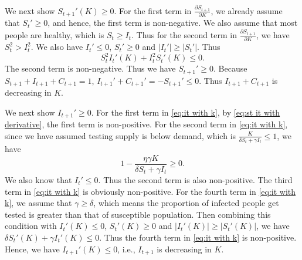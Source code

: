 \documentclass[nonblindrev, copyedit]{informs3a}
\newcounter{prop}[chapter]
\begin{document}
We next show $S_{t+1}'(K)\ge0$.
For the first term in $\frac{\partial S_{t+1}}{\partial K}$, we already assume that $S_t'\ge0$, and hence, the first term is non-negative. We also assume that most people are healthy, which is $S_{t}\ge I_{t}$.
Thus for the second term in $\frac{\partial S_{t+1}}{\partial K}$, we have $S_{t}^2>I_{t}^2$. We also have $I_t'\le 0$, $S_t'\ge 0$ and $|I_{t}'|\ge|S_{t}'|$. Thus
\begin{equation}\label{eq:st it with derivative}
    S_{t}^2I_t'(K)+I_{t}^2S_t'(K)\le0.
\end{equation}
The second term is non-negative. Thus we have $S_{t+1}'\ge0$. Because $S_{t+1}+I_{t+1}+C_{t+1}=1$, $I_{t+1}'+C_{t+1}'=-S_{t+1}'\le0$. Thus $I_{t+1}+C_{t+1}$ is decreasing in $K$.

We next show $I_{t+1}'\ge0$.
For the first term in \eqref{eq:it with k}, by \eqref{eq:st it with derivative}, the first term is non-positive. For the second term in \eqref{eq:it with k}, since we have assumed testing supply is below demand, which is $\frac{K}{\delta S_{t}+\gamma I_{t}}\le1$, we have
\begin{equation}\label{eq:testing capacity general}
    1-\frac{\eta\gamma K}{\delta S_{t}+\gamma I_{t}}\ge0.
\end{equation}
We also know that $I_t'\le0$. Thus the second term is also non-positive. The third term in \eqref{eq:it with k} is obviously non-positive. For the fourth term in \eqref{eq:it with k}, we assume that $\gamma\ge\delta$, which means the proportion of infected people get tested is greater than that of susceptible population. Then combining this condition with $I_t'(K)\le 0$, $S_t'(K)\ge 0$ and $|I_{t}'(K)|\ge|S_{t}'(K)|$, we have $\delta S_{t}'(K)+\gamma I_{t}'(K)\le0$. Thus the fourth term in \eqref{eq:it with k} is non-positive. Hence, we have $I_{t+1}'(K)\le0$, i.e., $I_{t+1}$ is decreasing in $K$.
\end{document}
